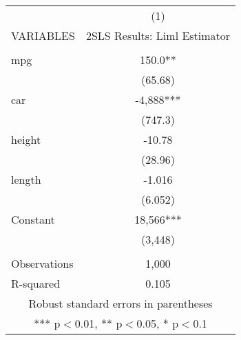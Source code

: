 \documentclass[]{article}
\begin{document}
\begin{tabular}{lc} \hline
 & (1) \\
VARIABLES & 2SLS Results: Liml Estimator \\ \hline
 &  \\
mpg & 150.0** \\
 & (65.68) \\
car & -4,888*** \\
 & (747.3) \\
height & -10.78 \\
 & (28.96) \\
length & -1.016 \\
 & (6.052) \\
Constant & 18,566*** \\
 & (3,448) \\
 &  \\
Observations & 1,000 \\
 R-squared & 0.105 \\ \hline
\multicolumn{2}{c}{ Robust standard errors in parentheses} \\
\multicolumn{2}{c}{ *** p$<$0.01, ** p$<$0.05, * p$<$0.1} \\
\end{tabular}
\end{document}
